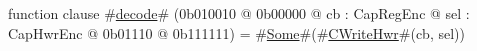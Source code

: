 function clause #\hyperref[zdecode]{decode}# (0b010010 @ 0b00000 @ cb : CapRegEnc @ sel : CapHwrEnc @   0b01110 @ 0b111111) = #\hyperref[zSome]{Some}#(#\hyperref[zCWriteHwr]{CWriteHwr}#(cb, sel))
